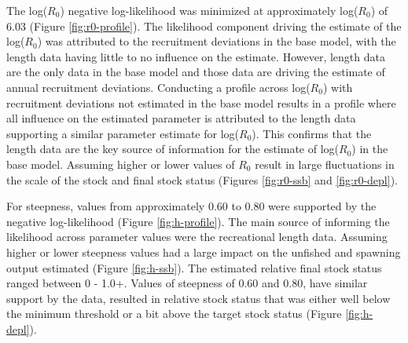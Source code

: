 \documentclass[11pt,
  english,
  a4paper,
]{article}
\begin{document}
The log({\(R_0\)\leavevmode\tagmcend\tagstructend}) negative log-likelihood was minimized at approximately log({\(R_0\)\leavevmode\tagmcend\tagstructend}) of 6.03 (Figure \ref{fig:r0-profile}). The likelihood component driving the estimate of the log({\(R_0\)\leavevmode\tagmcend\tagstructend}) was attributed to the recruitment deviations in the base model, with the length data having little to no influence on the estimate. However, length data are the only data in the base model and those data are driving the estimate of annual recruitment deviations. Conducting a profile across log({\(R_0\)\leavevmode\tagmcend\tagstructend}) with recruitment deviations not estimated in the base model results in a profile where all influence on the estimated parameter is attributed to the length data supporting a similar parameter estimate for log({\(R_0\)\leavevmode\tagmcend\tagstructend}). This confirms that the length data are the key source of information for the estimate of log({\(R_0\)\leavevmode\tagmcend\tagstructend}) in the base model. Assuming higher or lower values of {\(R_0\)\leavevmode\tagmcend\tagstructend} result in large fluctuations in the scale of the stock and final stock status (Figures \ref{fig:r0-ssb} and \ref{fig:r0-depl}).

\leavevmode\tagmcend\tagstructend\par


For steepness, values from approximately 0.60 to 0.80 were supported by the negative log-likelihood (Figure \ref{fig:h-profile}). The main source of informing the likelihood across parameter values were the recreational length data. Assuming higher or lower steepness values had a large impact on the unfished and spawning output estimated (Figure \ref{fig:h-ssb}). The estimated relative final stock status ranged between 0 - 1.0+. Values of steepness of 0.60 and 0.80, have similar support by the data, resulted in relative stock status that was either well below the minimum threshold or a bit above the target stock status (Figure \ref{fig:h-depl}).

\leavevmode\tagmcend\tagstructend\par
\end{document}
